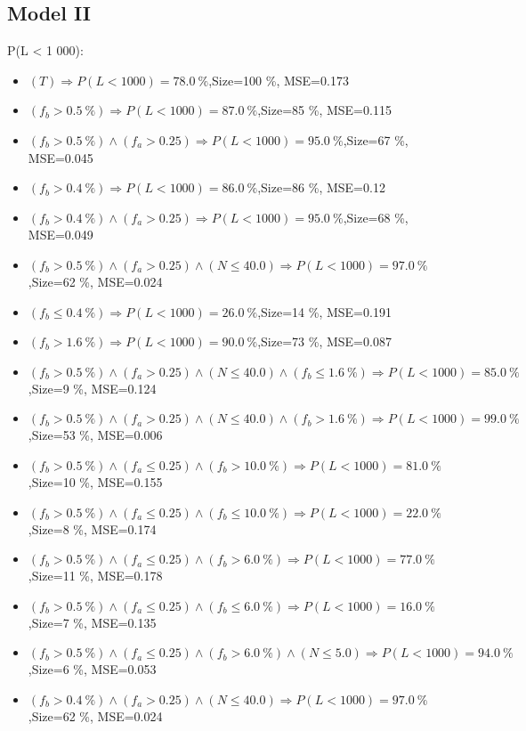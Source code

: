 \documentclass[numbered]{CSL}
\begin{document}
\subsection{Model II}
P(L < 1 000):
\begin{itemize}
\item $(T) \Rightarrow P(L < 1 000) = 78.0~\%$,\hfill Size=100 \%, MSE=0.173
\item $(f_b > 0.5~\%) \Rightarrow P(L < 1 000) = 87.0~\%$,\hfill Size=85 \%, MSE=0.115
\item $(f_b > 0.5~\%) \land (f_a > 0.25) \Rightarrow P(L < 1 000) = 95.0~\%$,\hfill Size=67 \%, MSE=0.045
\item $(f_b > 0.4~\%) \Rightarrow P(L < 1 000) = 86.0~\%$,\hfill Size=86 \%, MSE=0.12
\item $(f_b > 0.4~\%) \land (f_a > 0.25) \Rightarrow P(L < 1 000) = 95.0~\%$,\hfill Size=68 \%, MSE=0.049
\item $(f_b > 0.5~\%) \land (f_a > 0.25) \land (N \leq 40.0) \Rightarrow P(L < 1 000) = 97.0~\%$,\hfill Size=62 \%, MSE=0.024
\item $(f_b \leq 0.4~\%) \Rightarrow P(L < 1 000) = 26.0~\%$,\hfill Size=14 \%, MSE=0.191
\item $(f_b > 1.6~\%) \Rightarrow P(L < 1 000) = 90.0~\%$,\hfill Size=73 \%, MSE=0.087
\item $(f_b > 0.5~\%) \land (f_a > 0.25) \land (N \leq 40.0) \land (f_b \leq 1.6~\%) \Rightarrow P(L < 1 000) = 85.0~\%$,\hfill Size=9 \%, MSE=0.124
\item $(f_b > 0.5~\%) \land (f_a > 0.25) \land (N \leq 40.0) \land (f_b > 1.6~\%) \Rightarrow P(L < 1 000) = 99.0~\%$,\hfill Size=53 \%, MSE=0.006
\item $(f_b > 0.5~\%) \land (f_a \leq 0.25) \land (f_b > 10.0~\%) \Rightarrow P(L < 1 000) = 81.0~\%$,\hfill Size=10 \%, MSE=0.155
\item $(f_b > 0.5~\%) \land (f_a \leq 0.25) \land (f_b \leq 10.0~\%) \Rightarrow P(L < 1 000) = 22.0~\%$,\hfill Size=8 \%, MSE=0.174
\item $(f_b > 0.5~\%) \land (f_a \leq 0.25) \land (f_b > 6.0~\%) \Rightarrow P(L < 1 000) = 77.0~\%$,\hfill Size=11 \%, MSE=0.178
\item $(f_b > 0.5~\%) \land (f_a \leq 0.25) \land (f_b \leq 6.0~\%) \Rightarrow P(L < 1 000) = 16.0~\%$,\hfill Size=7 \%, MSE=0.135
\item $(f_b > 0.5~\%) \land (f_a \leq 0.25) \land (f_b > 6.0~\%) \land (N \leq 5.0) \Rightarrow P(L < 1 000) = 94.0~\%$,\hfill Size=6 \%, MSE=0.053
\item $(f_b > 0.4~\%) \land (f_a > 0.25) \land (N \leq 40.0) \Rightarrow P(L < 1 000) = 97.0~\%$,\hfill Size=62 \%, MSE=0.024

\end{itemize}
\end{document}
